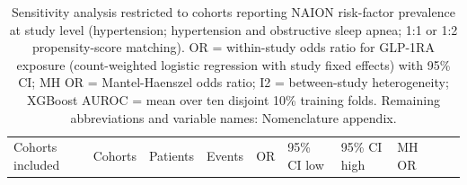 \documentclass[
  11pt,
]{article}
\begin{document}
\begin{longtable}[]{@{}
  >{\raggedright\arraybackslash}p{}
  >{\raggedright\arraybackslash}p{}
  >{\raggedright\arraybackslash}p{}
  >{\raggedright\arraybackslash}p{}
  >{\raggedright\arraybackslash}p{}
  >{\raggedright\arraybackslash}p{}
  >{\raggedright\arraybackslash}p{}
  >{\raggedright\arraybackslash}p{}
  >{\raggedright\arraybackslash}p{}
  >{\raggedright\arraybackslash}p{}@{}}
\caption{Sensitivity analysis restricted to cohorts reporting NAION
risk-factor prevalence at study level (hypertension; hypertension and
obstructive sleep apnea; 1:1 or 1:2 propensity-score matching). OR =
within-study odds ratio for GLP-1RA exposure (count-weighted logistic
regression with study fixed effects) with 95\% CI; MH OR =
Mantel-Haenszel odds ratio; I2 = between-study heterogeneity; XGBoost
AUROC = mean over ten disjoint 10\% training folds. Remaining
abbreviations and variable names: Nomenclature appendix.}\tabularnewline
\toprule\noalign{}
\begin{minipage}[b]{\linewidth}\raggedright
Cohorts included
\end{minipage} & \begin{minipage}[b]{\linewidth}\raggedright
Cohorts
\end{minipage} & \begin{minipage}[b]{\linewidth}\raggedright
Patients
\end{minipage} & \begin{minipage}[b]{\linewidth}\raggedright
Events
\end{minipage} & \begin{minipage}[b]{\linewidth}\raggedright
OR
\end{minipage} & \begin{minipage}[b]{\linewidth}\raggedright
95\% CI low
\end{minipage} & \begin{minipage}[b]{\linewidth}\raggedright
95\% CI high
\end{minipage} & \begin{minipage}[b]{\linewidth}\raggedright
MH OR
\end{minipage} & \begin{minipage}[b]{\linewidth}\raggedright

\end{minipage}
\end{longtable}
\end{document}
